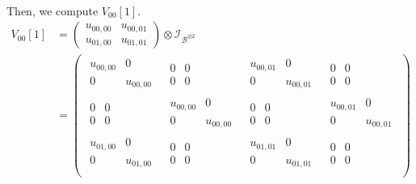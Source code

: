 \documentclass{exam} %
\newcommand{\cl}[1]{\mathcal{#1}}  %
\theoremstyle{plain}
\theoremstyle{definition}
\theoremstyle{remark}
\newcommand{\pmat}[1]{ \begin{pmatrix} #1 \end{pmatrix} }
\numberwithin{equation}{section}  %
\begin{document}
\begin{questions}
\begin{parts}
\begin{solution}
\begin{align*}
      \end{align*}
      Then, we compute $V_{00}[1]$.
      \begin{align*}
        V_{00}[1] &= \pmat{u_{00,00}&u_{00,01}\\u_{01,00}&u_{01,01}}\otimes \cl{I}_{\cl{B}^{\otimes2}}\\
          &= \pmat{
                   \begin{smallmatrix}u_{00,00}&0\\0&u_{00,00}\end{smallmatrix}&
                   \begin{smallmatrix} 0&0\\ 0&0 \end{smallmatrix}&
                   \begin{smallmatrix}u_{00,01}&0\\0&u_{00,01}\end{smallmatrix}&
                   \begin{smallmatrix} 0&0\\ 0&0 \end{smallmatrix}\\
                   \begin{smallmatrix} 0&0\\ 0&0 \end{smallmatrix}&
                   \begin{smallmatrix}u_{00,00}&0\\0&u_{00,00}\end{smallmatrix}&
                   \begin{smallmatrix} 0&0\\ 0&0 \end{smallmatrix}&
                   \begin{smallmatrix}u_{00,01}&0\\0&u_{00,01}\end{smallmatrix}\\
                   \begin{smallmatrix}u_{01,00}&0\\0&u_{01,00}\end{smallmatrix}&
                   \begin{smallmatrix} 0&0\\ 0&0 \end{smallmatrix}&
                   \begin{smallmatrix}u_{01,01}&0\\0&u_{01,01}\end{smallmatrix}&
                   \begin{smallmatrix} 0&0\\ 0&0 \end{smallmatrix}\\
}
\end{align*}
\end{solution}
\end{parts}
\end{questions}
\end{document}
